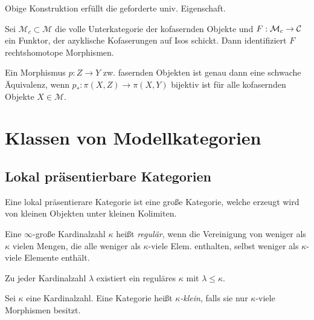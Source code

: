 \documentclass{cheat-sheet}
\newcommand{\ModC}{\mathcal{M}} %
\begin{document}
\begin{lem}
  Obige Konstruktion erfüllt die geforderte univ. Eigenschaft.
\end{lem}

\begin{lem}
  Sei $\ModC_c \subset \ModC$ die volle Unterkategorie der kofasernden Objekte und $F : \ModC_c \to \Cat$ ein Funktor, der azyklische Kofaserungen auf Isos schickt. Dann identifiziert $F$ rechtshomotope Morphismen.
\end{lem}

\begin{thm}
  Ein Morphismus $p : Z \to Y$ zw. fasernden Objekten ist genau dann eine schwache Äquivalenz, wenn $p_* : \pi(X, Z) \to \pi(X, Y)$ bijektiv ist für alle kofasernden Objekte $X \in \ModC$.
\end{thm}

\section{Klassen von Modellkategorien}

\subsection{Lokal präsentierbare Kategorien}


\begin{motto}
  Eine lokal präsentierare Kategorie ist eine große Kategorie, welche erzeugt wird von kleinen Objekten unter kleinen Kolimiten.
\end{motto}

\begin{defn}
  Eine $\infty$-große Kardinalzahl $\kappa$ heißt \emph{regulär}, wenn die Vereinigung von weniger als $\kappa$ vielen Mengen, die alle weniger als $\kappa$-viele Elem. enthalten, selbst weniger als $\kappa$-viele Elemente enthält.
\end{defn}

\begin{bem}
  Zu jeder Kardinalzahl $\lambda$ existiert ein reguläres $\kappa$ mit $\lambda \leq \kappa$.
\end{bem}

\begin{defn}
  Sei $\kappa$ eine Kardinalzahl. Eine Kategorie heißt \emph{$\kappa$-klein}, falls sie nur $\kappa$-viele Morphismen besitzt.
\end{defn}
\end{document}

